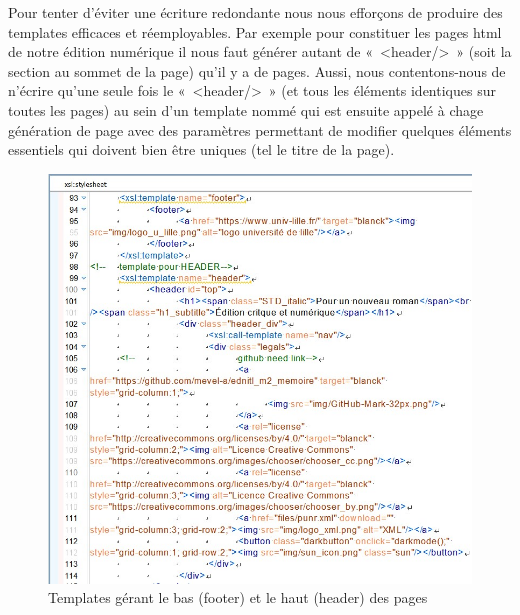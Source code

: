 Pour tenter d'éviter une écriture redondante nous nous efforçons de produire des templates efficaces et réemployables. Par exemple pour constituer les pages html de notre édition numérique il nous faut générer autant de «~<header/>~» (soit la section au sommet de la page) qu'il y a de pages. Aussi, nous contentons-nous de n'écrire qu'une seule fois le «~<header/>~» (et tous les éléments identiques sur toutes les pages) au sein d'un template nommé qui est ensuite appelé à chage génération de page avec des paramètres permettant de modifier quelques éléments essentiels qui doivent bien être uniques (tel le titre de la page).
\begin{figure}[H]
    \centering
    \includegraphics[scale=0.5]{img/screen_header.jpg}
    \caption{Templates gérant le bas (footer) et le haut (header) des pages}
    \label{fig:enter-label}
\end{figure}



